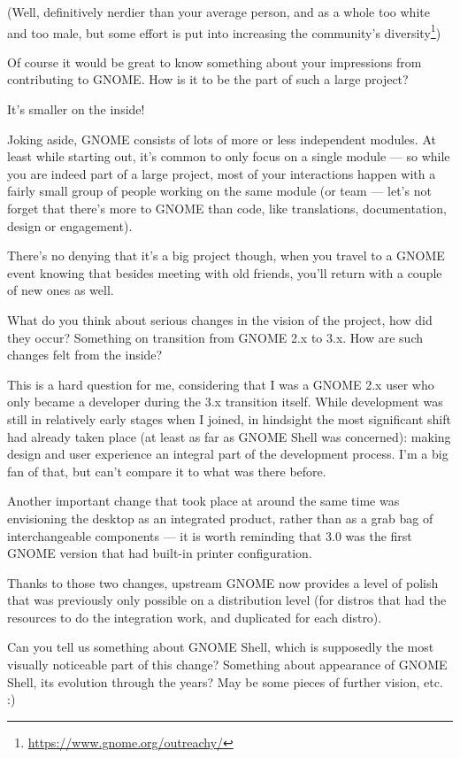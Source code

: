 \documentclass[10pt, a5paper]{article}
\begin{document}
\begin{Parallel}[p]{}{}
{(Well, definitively nerdier than your average person, and as a whole too white and too male, but some effort is put into increasing the community's diversity\footnote{\url{https://www.gnome.org/outreachy/}})


\q Of course it would be great to know something about your impressions from
contributing to GNOME. How is it to be the part of such a large project?

\a It's smaller on the inside!

Joking aside, GNOME consists of lots of more or less independent modules. At least while starting out, it's common to only focus on a single module — so while you are indeed part of a large project, most of your interactions happen with a fairly small group of people working on the same module (or team — let's not forget that there's more to GNOME than code, like translations, documentation, design or engagement).

There's no denying that it's a big project though, when you travel to a GNOME event knowing that besides meeting with old friends, you'll return with a couple of new ones as well.


\q What do you think about serious changes in the vision of the project,
how did they occur? Something on transition from GNOME 2.x to 3.x. How are
such changes felt from the inside?

\a This is a hard question for me, considering that I was a GNOME 2.x user who only became a developer during the 3.x transition itself. While development was still in relatively early stages when I joined, in hindsight the most significant shift had already taken place (at least as far as GNOME Shell was concerned): making design and user experience an integral part of the development process. I'm a big fan of that, but can't compare it to what was there before.

Another important change that took place at around the same time was envisioning the desktop as an integrated product, rather than as a grab bag of interchangeable components — it is worth reminding that 3.0 was the first GNOME version that had built-in printer configuration.

Thanks to those two changes, upstream GNOME now provides a level of polish that was previously only possible on a distribution level (for distros that had the resources to do the integration work, and duplicated for each distro).

\q Can you tell us something about GNOME Shell, which is supposedly the most visually noticeable part of this change? Something about appearance of GNOME Shell, its evolution through the years? May be some pieces of further vision, etc. :)

}
\end{Parallel}
\end{document}
